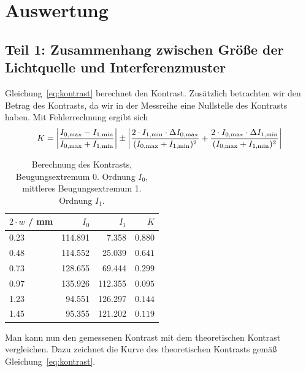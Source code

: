 \documentclass{article}
\begin{document}
\section{Auswertung}



\subsection{Teil 1: Zusammenhang zwischen Größe der Lichtquelle und Interferenzmuster}

Gleichung~\eqref{eq:kontrast} berechnet den Kontrast. Zusätzlich betrachten wir den Betrag des Kontrasts, da wir in der Messreihe eine Nullstelle des Kontrasts haben. Mit Fehlerrechnung ergibt sich
\begin{align*}
K = \left|\frac{I_\text{0,max}-I_\text{1,min}}{I_\text{0,max}+I_\text{1,min}} \right| \pm \left| \frac{ 2\cdot I_{1,\text{min}} \cdot \Delta I_{0,\text{max}} }{(I_\text{0,max}+I_\text{1,\text{min}})^2}  + \frac{ 2\cdot I_{0,\text{max}} \cdot \Delta I_{1,\text{min}} }{(I_\text{0,max}+I_\text{1,min})^2} \right|
\end{align*}



\begin{table}[H]
\caption{Berechnung des Kontrasts, Beugungsextremum 0. Ordnung $I_0$, mittleres Beugungsextremum 1. Ordnung $I_1$.}
\begin{tabular}{l|rr|r}
$2\cdot w$ / mm & $I_0$ & $I_1$ & $K$ \\
\hline
0.23 & 114.891 &   7.358 & $0.880$ \\
0.48 & 114.552 &  25.039 & $0.641$ \\
0.73 & 128.655 &  69.444 & $0.299$ \\
0.97 & 135.926 & 112.355 & $0.095$ \\
1.23 & 94.551  & 126.297 & $0.144$ \\
1.45 & 95.355 &  121.202 & $0.119$
\end{tabular}
\end{table}

Man kann nun den gemessenen Kontrast mit dem theoretischen Kontrast vergleichen. Dazu zeichnet die Kurve des theoretischen Kontrasts gemäß Gleichung~\eqref{eq:kontrast}.
\end{document}
